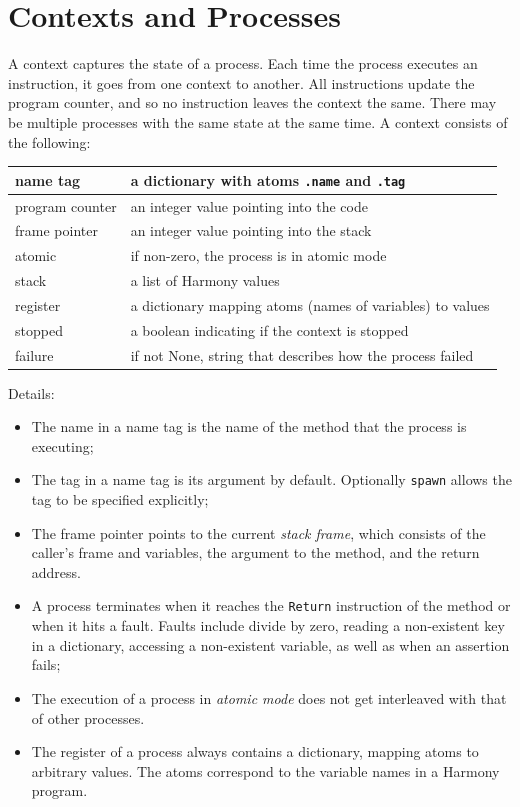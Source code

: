 \documentclass{report}
\begin{document}
\chapter{Contexts and Processes}
\label{app:context}

A context captures the state of a process.  Each time the process
executes an instruction, it goes from one context to another.
All instructions update the program counter, and so no instruction
leaves the context the same.
There may be multiple processes
with the same state at the same time.
A context consists of the following:

\vspace{1em}
\begin{tabular}{|l|l|}
\hline
name tag & a dictionary with atoms \texttt{.name} and \texttt{.tag} \\
\hline
program counter & an integer value pointing into the code \\
\hline
frame pointer & an integer value pointing into the stack \\
\hline
atomic & if non-zero, the process is in atomic mode \\
\hline
stack & a list of Harmony values \\
\hline
register & a dictionary mapping atoms (names of variables) to values \\
\hline
stopped & a boolean indicating if the context is stopped \\
\hline
failure & if not None, string that describes how the process failed \\
\hline
\end{tabular}
\vspace{1em}

Details:
\begin{itemize}
\item The name in a name tag is the name of the method that the process
is executing;
\item The tag in a name tag is its argument by default.  Optionally
\texttt{spawn} allows the tag to be specified explicitly;
\item The frame pointer points to the current \emph{stack frame},
which consists of the caller's frame and variables, the argument to
the method, and the return address.
\item A process terminates when it reaches the \texttt{Return} instruction
of the method or when it hits a fault.  Faults include divide by zero,
reading a non-existent key in a dictionary, accessing a non-existent
variable, as well as when an assertion fails;
\item The execution of a process in \emph{atomic mode} does not get interleaved
with that of other processes.
\item The register of a process always contains a dictionary, mapping
atoms to arbitrary values.  The atoms correspond to the variable names
in a Harmony program.
\end{itemize}
\end{document}
